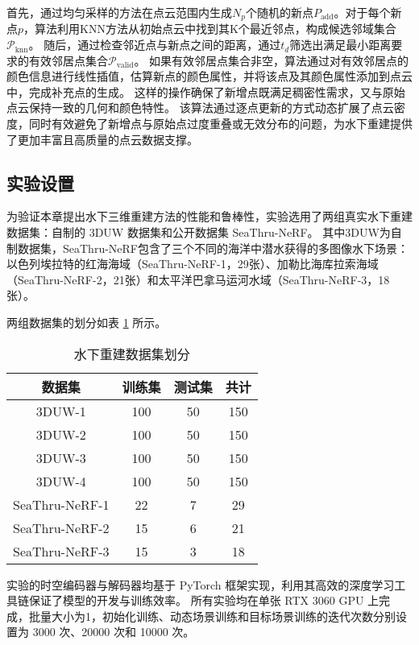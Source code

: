 首先，通过均匀采样的方法在点云范围内生成$N_p$个随机的新点$P_\text{add}$。对于每个新点$p$，算法利用KNN方法从初始点云中找到其K个最近邻点，构成候选邻域集合$\mathcal{P}_\text{knn}$。
随后，通过检查邻近点与新点之间的距离，通过$t_d$筛选出满足最小距离要求的有效邻居点集合$\mathcal{P}_\text{valid}$。
如果有效邻居点集合非空，算法通过对有效邻居点的颜色信息进行线性插值，估算新点的颜色属性，并将该点及其颜色属性添加到点云中，完成补充点的生成。
这样的操作确保了新增点既满足稠密性需求，又与原始点云保持一致的几何和颜色特性。
该算法通过逐点更新的方式动态扩展了点云密度，同时有效避免了新增点与原始点过度重叠或无效分布的问题，为水下重建提供了更加丰富且高质量的点云数据支撑。

\subsection{实验设置}
为验证本章提出水下三维重建方法的性能和鲁棒性，实验选用了两组真实水下重建数据集：自制的 3DUW 数据集和公开数据集 SeaThru-NeRF\cite{seathru}。
其中3DUW为自制数据集，SeaThru-NeRF包含了三个不同的海洋中潜水获得的多图像水下场景：
以色列埃拉特的红海海域（SeaThru-NeRF-1，29张）、加勒比海库拉索海域（SeaThru-NeRF-2，21张）和太平洋巴拿马运河水域（SeaThru-NeRF-3，18张）。

两组数据集的划分如表 \ref{tab:recondata_split} 所示。
\begin{table}[htbp]
    \centering
    \caption{水下重建数据集划分}
    \label{tab:recondata_split}
    \begin{tabular}{cccc}
        \toprule
        数据集 & 训练集 & 测试集 & 共计 \\
        \midrule
        3DUW-1 & 100 & 50 & 150 \\
        3DUW-2 & 100 & 50 & 150 \\
        3DUW-3 & 100 & 50 & 150 \\
        3DUW-4 & 100 & 50 & 150 \\
        SeaThru-NeRF-1 & 22 & 7 & 29 \\
        SeaThru-NeRF-2 & 15 & 6 & 21 \\
        SeaThru-NeRF-3 & 15 & 3 & 18 \\
        \bottomrule
    \end{tabular}
\end{table}
实验的时空编码器与解码器均基于 PyTorch 框架\cite{pytorch}实现，利用其高效的深度学习工具链保证了模型的开发与训练效率。
所有实验均在单张 RTX 3060 GPU 上完成，批量大小为1，初始化训练、动态场景训练和目标场景训练的迭代次数分别设置为 3000 次、20000 次和 10000 次。

